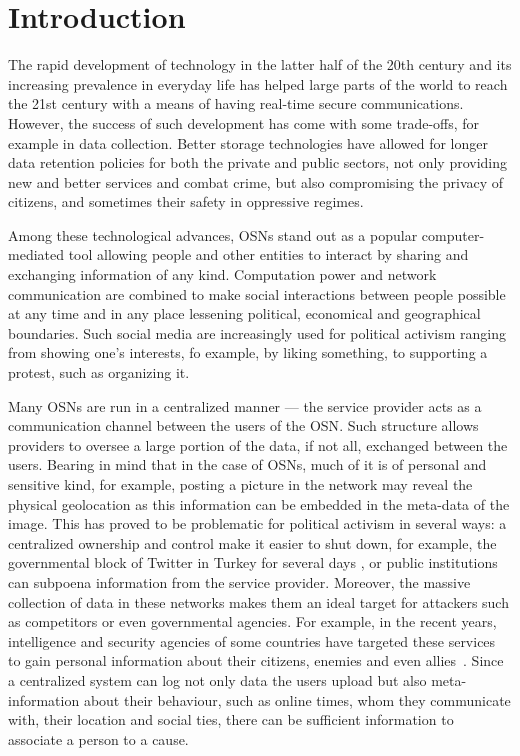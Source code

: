 \section{Introduction}
\label{Introduction}
The rapid development of technology in the latter half of the
20th century and its increasing prevalence in
everyday life has helped large parts of the world to reach the
21st century with a means of having real-time secure
communications.  However, the success of such development has come
with some trade-offs, for example in data collection. Better storage
technologies have allowed for longer data retention policies for both
the private and public sectors, not only providing new and better
services and combat crime, but also compromising the privacy of
citizens, and sometimes their safety in oppressive regimes.

Among these technological advances, \acp{OSN} stand out as a popular
computer-mediated tool allowing people and other entities to interact
by sharing and exchanging information of any kind. Computation power
and network communication are combined to make social interactions
between people possible at any time and in any place lessening
political, economical and geographical boundaries. Such social media
are increasingly used for political activism ranging from showing
one's interests, fo example, by liking something, to supporting a protest, 
such as organizing it. 

Many \acp{OSN} are run in a centralized manner --- the service
provider acts as a communication channel between the users of the
\ac{OSN}. Such structure allows providers to oversee a large portion
of the data, if not all, exchanged between the users. Bearing in mind
that in the case of \acp{OSN}, much of it is of personal and sensitive
kind, for example, posting a picture in the network may reveal the
physical geolocation as this information can be embedded in the
meta-data of the image. This has proved to be problematic for
political activism in several ways: a centralized ownership and
control make it easier to shut down, for example, the governmental block of Twitter in
Turkey for several days \cite{TwitterBanTurkey}, or public institutions 
can subpoena information from the service provider. Moreover, the massive
collection of data in these networks makes them an ideal target for
attackers such as competitors or even governmental agencies. For
example, in the recent years, intelligence and security agencies of
some countries have targeted these services to gain personal
information about their citizens, enemies and even
allies~\cite{Prism}. Since a centralized system can log not only data
the users upload but also meta-information about their behaviour, such
as online times, whom they communicate with, their location and social
ties, there can be sufficient information to associate a person to a cause.

